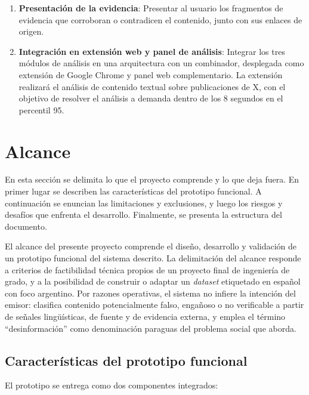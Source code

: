 \begin{enumerate}
    \item \textbf{Presentación de la evidencia}: Presentar al usuario los fragmentos de evidencia que corroboran o contradicen el contenido, junto con sus enlaces de origen.

    \item \textbf{Integración en extensión web y panel de análisis}: Integrar los tres módulos de análisis en una arquitectura con un combinador, desplegada como extensión de Google Chrome y panel web complementario. La extensión realizará el análisis de contenido textual sobre publicaciones de X, con el objetivo de resolver el análisis a demanda dentro de los 8 segundos en el percentil 95.

\end{enumerate}

\section{Alcance}

En esta sección se delimita lo que el proyecto comprende y lo que deja fuera. En primer lugar se describen las características del prototipo funcional. A continuación se enuncian las limitaciones y exclusiones, y luego los riesgos y desafíos que enfrenta el desarrollo. Finalmente, se presenta la estructura del documento.

El alcance del presente proyecto comprende el diseño, desarrollo y validación de un prototipo funcional del sistema descrito. La delimitación del alcance responde a criterios de factibilidad técnica propios de un proyecto final de ingeniería de grado, y a la posibilidad de construir o adaptar un \textit{dataset} etiquetado en español con foco argentino. Por razones operativas, el sistema no infiere la intención del emisor: clasifica contenido potencialmente falso, engañoso o no verificable a partir de señales lingüísticas, de fuente y de evidencia externa, y emplea el término \enquote{desinformación} como denominación paraguas del problema social que aborda.

\subsection{Características del prototipo funcional}

El prototipo se entrega como dos componentes integrados:

